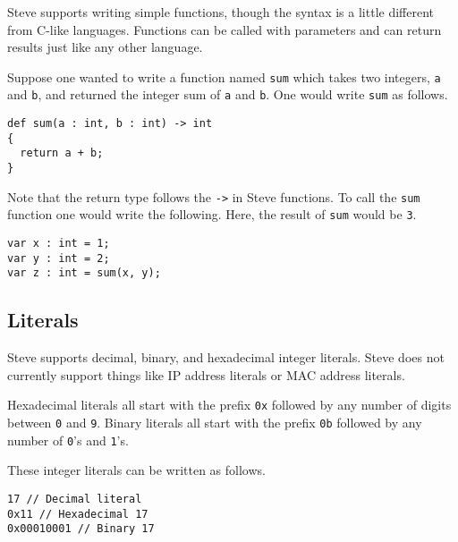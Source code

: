 Steve supports writing simple functions, though the syntax is a little different
from C-like languages. Functions can be called with parameters and can return
results just like any other language.

Suppose one wanted to write a function named \texttt{sum} which takes two
integers, \texttt{a} and \texttt{b}, and returned the integer sum of \texttt{a}
and \texttt{b}. One would write \texttt{sum} as follows.

\begin{codepage}
\begin{lstlisting}
def sum(a : int, b : int) -> int
{
  return a + b;
}
\end{lstlisting}
\end{codepage}

Note that the return type follows the \texttt{->} in Steve functions. To call
the \texttt{sum} function one would write the following. Here, the result of
\texttt{sum} would be \texttt{3}.

\begin{codepage}
\begin{lstlisting}
var x : int = 1;
var y : int = 2;
var z : int = sum(x, y);
\end{lstlisting}
\end{codepage}

\subsection{Literals} \label{tut:literal}


Steve supports decimal, binary, and hexadecimal integer literals. Steve does not
currently support things like IP address literals or MAC address literals.

Hexadecimal literals all start with the prefix \texttt{0x} followed by any
number of digits between \texttt{0} and \texttt{9}. Binary literals all start with the prefix \texttt{0b} followed by any number of
\texttt{0}'s and \texttt{1}'s.

These integer literals can be written as follows.

\begin{codepage}
\begin{lstlisting}
17 // Decimal literal
0x11 // Hexadecimal 17
0x00010001 // Binary 17
\end{lstlisting}
\end{codepage}
 
